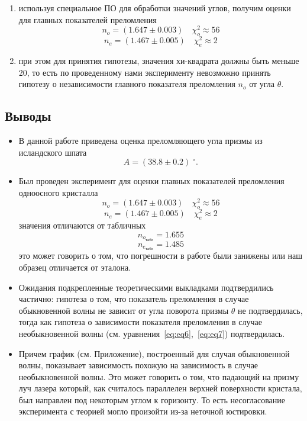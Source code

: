 \documentclass[12pt]{article}
\begin{document}
\begin{enumerate}
\begin{enumerate}
            \item используя специальное ПО для обработки значений углов,
            получим оценки для главных показателей преломления
            \[n_o = (1.647 \pm 0.003) \quad \chi^2_o \approx 56\]
            \[n_e = (1.467 \pm 0.005) \quad \chi^2_e \approx 2\]
            \item при этом для принятия гипотезы, значения хи-квадрата должны быть меньше 20,
            то есть по проведенному нами эксперименту невозможно принять гипотезу
            о независимости главного показателя преломления $n_o$ от угла $\theta$.
        \end{enumerate}
    \end{enumerate}

    \subsection*{Выводы}
    \begin{itemize}[label=]
        \item В данной работе приведена оценка преломляющего угла призмы из исландского шпата
        \[A = (38.8 \pm 0.2)\;^{\circ}.\]
        \item Был проведен эксперимент для оценки главных показателей преломления одноосного кристалла
        \[n_o = (1.647 \pm 0.003) \quad \chi^2_o \approx 56\]
        \[n_e = (1.467 \pm 0.005) \quad \chi^2_e \approx 2\]
        значения отличаются от табличных
        \[n_o_{\text{табл}} = 1.655\]
        \[n_e_{\text{табл}} = 1.485\]
        это может говорить о том, что погрешности в работе были занижены или наш образец отличается от эталона.
        \item Ожидания подкрепленные теоретическими выкладками подтвердились частично: гипотеза о том,
        что показатель преломления в случае обыкновенной волны не зависит от угла поворота призмы $\theta$
        не подтвердилась, тогда как гипотеза о зависимости показателя преломления в случае
        необыкновенной волны (см. уравнения\ \eqref{eq:eq6},\ \eqref{eq:eq7}) подтвердилась.
        \item Причем график (см. Приложение), построенный для случая обыкновенной волны,
        показывает зависимость похожую на зависимость в случае необыкновенной волны.
        Это может говорить о том, что падающий на призму луч лазера который,
        как считалось параллелен верхней поверхности кристала, был направлен под некоторым углом к горизонту.
        То есть несогласование эксперимента с теорией могло произойти из-за неточной юстировки.
    \end{itemize}
\end{document}
